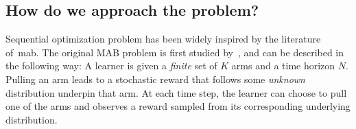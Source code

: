 

\subsection{How do we approach the problem?}\label{sec:intro.context.how}

Sequential optimization problem has been widely inspired by the literature of~\gls{mab}. The original MAB problem is first studied by~\cite{thompson1933}, and can be described in the following way: A learner is given a \emph{finite} set of $K$ arms and a time horizon $N$. Pulling an arm leads to a stochastic reward that follows some \emph{unknown} distribution underpin that arm. At each time step, the learner can choose to pull one of the arms and observes a reward sampled from its corresponding underlying distribution.


